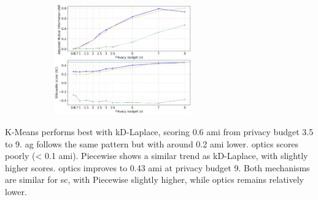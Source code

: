 \begin{figure}[H]
\begin{subfigure}{1\textwidth}
    \centering
    \includegraphics[width=0.65\textwidth]{Results/kd-laplace/piecewise/line-dataset/ami-and-sc_3_dimensions.png}
  \end{subfigure}
  \label{fig:validation-line-dataset_comparison_3d-laplace}
\end{figure}
K-Means performs best with kD-Laplace, scoring 0.6 \gls{ami} from privacy budget 3.5 to 9.
\gls{ag} follows the same pattern but with around 0.2 \gls{ami} lower.
\gls{optics} scores poorly (< 0.1 \gls{ami}).
Piecewise shows a similar trend as kD-Laplace, with slightly higher scores. \gls{optics} improves to 0.43 \gls{ami} at privacy budget 9.
Both mechanisms are similar for \gls{sc}, with Piecewise slightly higher, while \gls{optics} remains relatively lower.
\newpage
